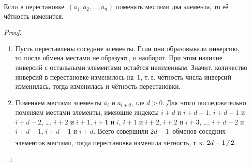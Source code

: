 \begin{statement}
\label{st:parity_of_permutation}
Если в перестановке~$(a_1, a_2, \ldots, a_n)$ поменять местами два элемента, то её чётность изменится.
\end{statement}
\begin{proof}
\begin{enumerate}
	\item Пусть переставлены соседние элементы.
	Если они образовывали инверсию, то после обмена местами не образуют, и наоборот.
	При этом наличие инверсий с остальными элементами остаётся неизменным.
	Значит, количество инверсий в перестановке изменилось на~$1$, т.\,е. чётность числа инверсий изменилась, тогда изменилась и чётность перестановки.
	
	\item Поменяем местами элементы $a_i$ и $a_{i+d}$, где $d > 0$.
	Для этого последовательно поменяем местами элементы, имеющие индексы $i+d$ и $i+d-1$, $i+d-1$ и $i+d-2$, \ldots, $i+2$ и $i+1$, $i+1$ и $i$, $i+1$ и $i+2$, $i+2$ и $i+3$, \ldots, $i+d-2$ и $i+d-1$, $i+d-1$ и $i+d$.
	Всего совершили $2d - 1$~обменов соседних элементов местами, тогда перестановка изменила чётность, т.\,к. $2d - 1 \notmult 2$.
\end{enumerate}
\end{proof}